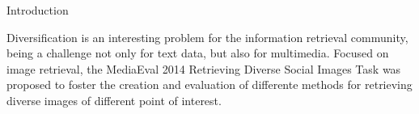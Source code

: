 
\begin{section}{Introduction}

Diversification is an interesting problem for the information retrieval community, 
being a challenge not only for text data, but also for multimedia.
Focused on image retrieval, the MediaEval 2014 Retrieving Diverse Social Images Task \cite{overview14}
was proposed to foster the creation and evaluation of differente methods for retrieving 
diverse images of different point of interest.

\end{section}


